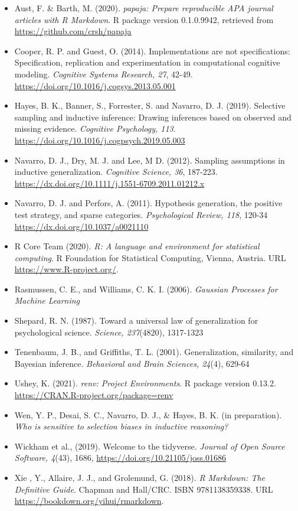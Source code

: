 \documentclass[
  english,
  doc]{apa6}
\providecommand{\tightlist}{%
  \setlength{\itemsep}{0pt}\setlength{\parskip}{0pt}}
\begin{document}
\begin{itemize}
\tightlist
\item
  Aust, F. \& Barth, M. (2020). \emph{papaja: Prepare reproducible APA journal
  articles with R Markdown}. R package version 0.1.0.9942, retrieved from
  \url{https://github.com/crsh/papaja}
\item
  Cooper, R. P. and Guest, O. (2014). Implementations are not specifications: Specification, replication and experimentation in computational cognitive modeling. \emph{Cognitive Systems Research, 27}, 42-49. \url{https://doi.org/10.1016/j.cogsys.2013.05.001}
\item
  Hayes, B. K., Banner, S., Forrester, S. and Navarro, D. J. (2019). Selective sampling and inductive inference: Drawing inferences based on observed and missing evidence. \emph{Cognitive Psychology, 113}. \url{https://doi.org/10.1016/j.cogpsych.2019.05.003}
\item
  Navarro, D. J., Dry, M. J. and Lee, M D. (2012). Sampling assumptions in inductive generalization. \emph{Cognitive Science, 36}, 187-223. \url{https://dx.doi.org/10.1111/j.1551-6709.2011.01212.x}
\item
  Navarro, D. J. and Perfors, A. (2011). Hypothesis generation, the positive test strategy, and sparse categories. \emph{Psychological Review, 118}, 120-34 \url{https://dx.doi.org/10.1037/a0021110}
\item
  R Core Team (2020). \emph{R: A language and environment for statistical computing}. R Foundation for Statistical Computing, Vienna, Austria. URL
  \url{https://www.R-project.org/}.
\item
  Rasmussen, C. E., and Williams, C. K. I. (2006). \emph{Gaussian Processes for Machine Learning}
\item
  Shepard, R. N. (1987). Toward a universal law of generalization for psychological science. \emph{Science, 237}(4820), 1317-1323
\item
  Tenenbaum, J. B., and Griffiths, T. L. (2001). Generalization, similarity, and Bayesian inference. \emph{Behavioral and Brain Sciences, 24}(4), 629-64
\item
  Ushey, K. (2021). \emph{renv: Project Environments}. R package version 0.13.2.
  \url{https://CRAN.R-project.org/package=renv}
\item
  Wen, Y. P., Desai, S. C., Navarro, D. J., \& Hayes, B. K. (in preparation). \emph{Who is sensitive to selection biases in inductive reasoning?}
\item
  Wickham et al., (2019). Welcome to the tidyverse. \emph{Journal of Open Source Software, 4}(43), 1686, \url{https://doi.org/10.21105/joss.01686}
\item
  Xie , Y., Allaire, J. J., and Grolemund, G. (2018). \emph{R Markdown: The Definitive Guide}. Chapman and Hall/CRC. ISBN 9781138359338. URL \url{https://bookdown.org/yihui/rmarkdown}.
\end{itemize}
\end{document}
